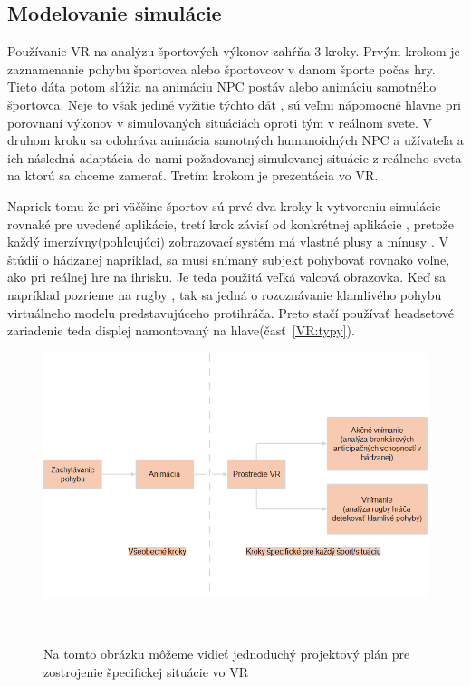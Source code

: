 \documentclass[10pt,twoside,slovak,a4paper]{article}										%
\begin{document}
\subsection{Modelovanie simulácie} \label{SW:model}
Používanie VR na analýzu športových výkonov zahŕňa 3 kroky. Prvým krokom je zaznamenanie pohybu športovca alebo športovcov v danom športe počas hry. Tieto dáta potom slúžia na animáciu NPC postáv alebo animáciu samotného športovca. Neje to však jediné vyžitie týchto dát , sú veľmi nápomocné hlavne pri porovnaní výkonov v simulovaných situáciách oproti tým v reálnom svete. V druhom kroku sa odohráva animácia samotných humanoidných NPC a užívateľa a ich následná adaptácia do nami požadovanej simulovanej situácie z reálneho sveta na ktorú sa chceme zamerať. Tretím krokom je prezentácia vo VR.

Napriek tomu že pri väčšine športov sú prvé dva kroky k vytvoreniu simulácie rovnaké pre uvedené aplikácie, tretí krok závisí od konkrétnej aplikácie , pretože každý imerzívny(pohlcujúci) zobrazovací systém má vlastné plusy a mínusy . V štúdií o hádzanej napríklad, sa musí snímaný subjekt pohybovať rovnako voľne, ako pri reálnej hre na ihrisku. Je teda použitá veľká valcová obrazovka. Keď sa napríklad pozrieme na rugby , tak sa jedná o rozoznávanie klamlivého pohybu virtuálneho modelu predstavujúceho protihráča. Preto stačí používať headsetové zariadenie teda displej namontovaný na hlave(časť~\ref{VR:typy}). ~\cite{Hlavny:zdroj}

\begin{figure}[htbp]
\centering
\includegraphics[scale=0.4]{model.png}
\caption{Na tomto obrázku môžeme vidieť jednoduchý projektový plán pre zostrojenie špecifickej situácie vo VR}  ~\cite{Hlavny:zdroj}
\label{fig}
\end{figure}
\end{document}
